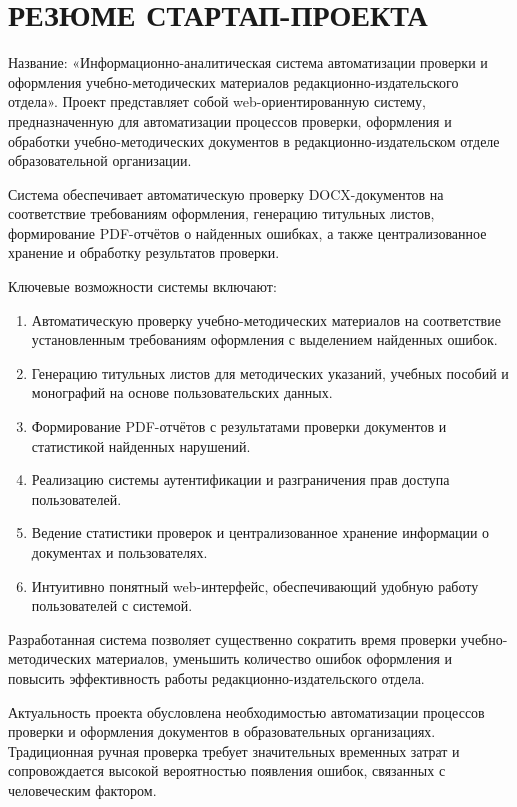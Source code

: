 \newpage
\section*{РЕЗЮМЕ СТАРТАП-ПРОЕКТА}


Название: «Информационно-аналитическая система автоматизации проверки и оформления учебно-методических материалов редакционно-издательского отдела». Проект представляет собой web-ориентированную систему, предназначенную для автоматизации процессов проверки, оформления и обработки учебно-методических документов в редакционно-издательском отделе образовательной организации.

Система обеспечивает автоматическую проверку DOCX-документов на соответствие требованиям оформления, генерацию титульных листов, формирование PDF-отчётов о найденных ошибках, а также централизованное хранение и обработку результатов проверки.

Ключевые возможности системы включают:
\begin{enumerate}
	\item Автоматическую проверку учебно-методических материалов на соответствие установленным требованиям оформления с выделением найденных ошибок.
	
	\item Генерацию титульных листов для методических указаний, учебных пособий и монографий на основе пользовательских данных.
	
	\item Формирование PDF-отчётов с результатами проверки документов и статистикой найденных нарушений.
	
	\item Реализацию системы аутентификации и разграничения прав доступа пользователей.
	
	\item Ведение статистики проверок и централизованное хранение информации о документах и пользователях.
	
	\item Интуитивно понятный web-интерфейс, обеспечивающий удобную работу пользователей с системой.
\end{enumerate}

Разработанная система позволяет существенно сократить время проверки учебно-методических материалов, уменьшить количество ошибок оформления и повысить эффективность работы редакционно-издательского отдела.

Актуальность проекта обусловлена необходимостью автоматизации процессов проверки и оформления документов в образовательных организациях. Традиционная ручная проверка требует значительных временных затрат и сопровождается высокой вероятностью появления ошибок, связанных с человеческим фактором.

